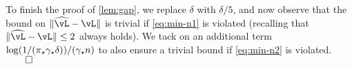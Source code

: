 To finish the proof of \cref{lem:gap}, we replace $\delta$ with
$\delta/5$, and now observe that the bound on $\norm{\wh\vL-\vL}$ is
trivial if \cref{eq:min-n1} is violated (recalling that
$\norm{\wh\vL-\vL} \leq 2$ always holds).
We tack on an additional term $\log(1/(\pi_{\star}\gamma_{\star}\delta)) / (\gamma_{\star} n)$
to also ensure a trivial bound if \cref{eq:min-n2} is violated.
\hfill $\qed$

